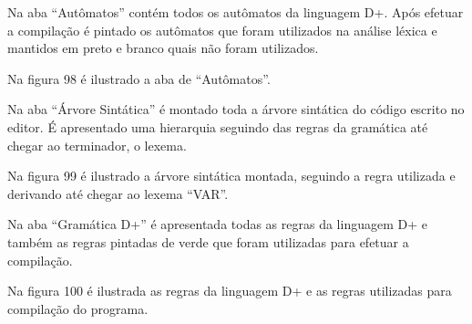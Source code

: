 \documentclass[12pt,oneside,a4paper,chapter=TITLE,section=TITLE,sumario=tradicional]{abntex2}
\begin{document}
Na aba “Autômatos” contém todos os autômatos da linguagem D+. Após efetuar a compilação é pintado os autômatos que foram utilizados na análise léxica e mantidos em preto e branco quais não foram utilizados.

Na figura 98 é ilustrado a aba de “Autômatos”.

\begin{figure}[H]
\end{figure}

Na aba “Árvore Sintática” é montado toda a árvore sintática do código escrito no editor. É apresentado uma hierarquia seguindo das regras da gramática até chegar ao terminador, o lexema.

Na figura 99 é ilustrado a árvore sintática montada, seguindo a regra utilizada e derivando até chegar ao lexema “VAR”.

\begin{figure}[H]
\end{figure}

Na aba “Gramática D+” é apresentada todas as regras da linguagem D+ e também as regras pintadas de verde que foram utilizadas para efetuar a compilação.

Na figura 100 é ilustrada as regras da linguagem D+ e as regras utilizadas para compilação do programa.

\begin{figure}[H]
\end{figure}
\end{document}
